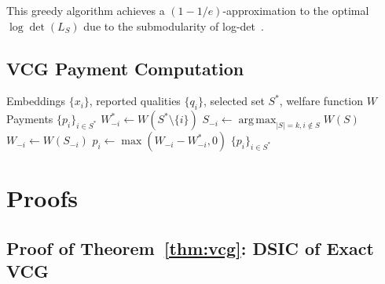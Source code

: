 \documentclass[10pt]{article}
\DeclareMathOperator*{\argmax}{arg\,max}
\begin{document}
This greedy algorithm achieves a $(1-1/e)$-approximation to the optimal $\log\det(L_S)$ due to the submodularity of log-det~\citep{kulesza2012determinantal}.

\subsection{VCG Payment Computation}

\begin{algorithm}[H]
\caption{VCG Payments for Diverse Selection}
\label{alg:vcg}
\begin{algorithmic}[1]
\REQUIRE Embeddings $\{x_i\}$, reported qualities $\{q_i\}$, selected set $S^*$, welfare function $W$
\ENSURE Payments $\{p_i\}_{i \in S^*}$
  \STATE $W_{-i}^* \leftarrow W(S^* \setminus \{i\})$ 
  \STATE $S_{-i} \leftarrow \argmax_{|S|=k, i \notin S} W(S)$ 
  \STATE $W_{-i} \leftarrow W(S_{-i})$ 
  \STATE $p_i \leftarrow \max(W_{-i} - W_{-i}^*, 0)$ 
\ENDFOR
\RETURN $\{p_i\}_{i \in S^*}$
\end{algorithmic}
\end{algorithm}

\section{Proofs}
\label{app:proofs}

\subsection{Proof of Theorem~\ref{thm:vcg}: DSIC of Exact VCG}
\end{document}
